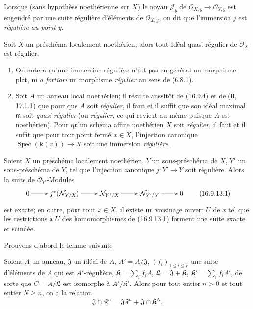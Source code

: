 Lorsque (sans hypothèse noethérienne sur $X$) le noyau $\mathscr{J}_y$ de
$\mathcal{O}_{X,y}\to\mathcal{O}_{Y,y}$ est engendré par une suite régulière
d'éléments de $\mathcal{O}_{X,y}$, on dit que l'immersion $j$ est
\emph{régulière au point $y$}.

\begin{corollary}[16.9.11]
\label{IV.16.9.11}
Soit $X$ un préschéma localement noethérien; alors tout Idéal quasi-régulier de
$\mathcal{O}_X$ est régulier.
\end{corollary}

\begin{remarks}[16.9.12]
\label{IV.16.9.12}
\begin{enumerate}
  \item[(i)] On notera qu'une immersion régulière n'est pas en général un
  morphisme plat, ni \emph{a fortiori} un morphisme \emph{régulier} au sens de
  (6.8.1).
  \item[(ii)] Soit $A$ un anneau local noethérien; il résulte aussitôt de
  (16.9.4) et de (\textbf{0}, 17.1.1) que pour que $A$ soit \emph{régulier}, il faut et
  il suffit que son idéal maximal $\mathfrak{m}$ soit \emph{quasi-régulier}
  (ou \emph{régulier}, ce qui revient au même puisque $A$ est noethérien).
  Pour qu'un schéma affine noethérien $X$ soit \emph{régulier}, il faut et il
  suffit que pour tout point fermé $x\in X$, l'injection canonique
  $\operatorname{Spec}(\boldsymbol{k}(x))\to X$ soit une immersion \emph{régulière}.
\end{enumerate}
\end{remarks}

\begin{proposition}[16.9.13]
\label{IV.16.9.13}
Soient $X$ un préschéma localement noethérien, $Y$ un sous-préschéma de $X$,
$Y'$ un sous-préschéma de $Y$, tel que l'injection canonique $j:Y'\to Y$ soit
régulière. Alors la suite de $\mathcal{O}_{Y'}$-Modules
\[
  \xymatrix{
    0\ar[r] & j^*(\mathcal{N}_{Y/X})\ar[r]
      & \mathcal{N}_{Y'/X}\ar[r] & \mathcal{N}_{Y'/Y}\ar[r] & 0
  }
  \tag{16.9.13.1}
  \label{IV.16.9.13.1}
\]
est exacte; en outre, pour tout $x\in X$, il existe un voisinage ouvert $U$
de $x$ tel que les restrictions à $U$ des homomorphismes de \textup{(16.9.13.1)}
forment une suite exacte et scindée.
\end{proposition}

Prouvons d'abord le lemme suivant:

\begin{lemma}[16.9.13.2]
\label{IV.16.9.13.2}
Soient $A$ un anneau, $\mathfrak{J}$ un idéal de $A$,
$A'=A/\mathfrak{J}$, $(f_i)_{1\leq i\leq r}$ une suite d'éléments de $A$ qui
est $A'$-régulière, $\mathfrak{K}=\sum_i f_iA$,
$\mathfrak{L}=\mathfrak{J}+\mathfrak{K}$,
$\mathfrak{K}'=\sum_i f_iA'$, de sorte que $C=A/\mathfrak{L}$ est isomorphe à
$A'/\mathfrak{K}'$. Alors pour tout entier $n>0$ et tout entier $N\geq n$,
on a la relation
\[
  \mathfrak{J}\cap\mathfrak{K}^n
  =\mathfrak{J}\mathfrak{K}^n+\mathfrak{J}\cap\mathfrak{K}^N.
  \tag{16.9.13.3}
  \label{IV.16.9.13.3}
\]
\end{lemma}

